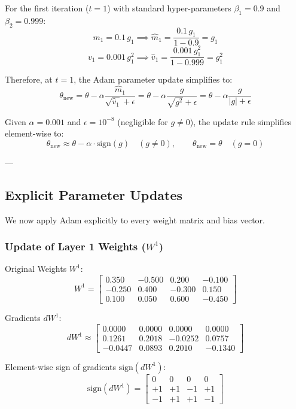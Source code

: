 \documentclass[11pt]{article}
\begin{document}
For the first iteration ($t=1$) with standard hyper-parameters $\beta_1 = 0.9$ and $\beta_2 = 0.999$:
\[
m_1 = 0.1\,g_1 \implies \hat{m}_1 = \frac{0.1\,g_1}{1-0.9} = g_1
\]
\[
v_1 = 0.001\,g_1^2 \implies \hat{v}_1 = \frac{0.001\,g_1^2}{1-0.999} = g_1^2
\]

Therefore, at $t=1$, the Adam parameter update simplifies to:
\[
\theta_{\text{new}} = \theta - \alpha \frac{\hat{m}_1}{\sqrt{\hat{v}_1} + \epsilon} = \theta - \alpha \frac{g}{\sqrt{g^2} + \epsilon} = \theta - \alpha \frac{g}{|g| + \epsilon}
\]

Given $\alpha = 0.001$ and $\epsilon = 10^{-8}$ (negligible for $g \neq 0$), the update rule simplifies element-wise to:
\[
\theta_{\text{new}} \approx \theta - \alpha \cdot \text{sign}(g) \quad (g \neq 0), \qquad \theta_{\text{new}} = \theta \quad (g = 0)
\]

---

\subsection{Explicit Parameter Updates}

We now apply Adam explicitly to every weight matrix and bias vector.

\subsubsection{Update of Layer 1 Weights (\texorpdfstring{$W^1$}{W1})}

Original Weights $W^1$:
\[
W^1 =
\begin{bmatrix}
0.350 & -0.500 & 0.200 & -0.100 \\
-0.250 & 0.400 & -0.300 & 0.150 \\
0.100 & 0.050 & 0.600 & -0.450
\end{bmatrix}
\]

Gradients $dW^1$:
\[
dW^1 \approx
\begin{bmatrix}
0.0000 & 0.0000 & 0.0000 & 0.0000 \\
0.1261 & 0.2018 & -0.0252 & 0.0757 \\
-0.0447 & 0.0893 & 0.2010 & -0.1340
\end{bmatrix}
\]

Element-wise sign of gradients $\text{sign}(dW^1)$:
\[
\text{sign}(dW^1) =
\begin{bmatrix}
0 & 0 & 0 & 0 \\
+1 & +1 & -1 & +1 \\
-1 & +1 & +1 & -1
\end{bmatrix}
\]
\end{document}
